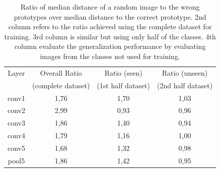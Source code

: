 \begin{table}[htb]
\centering
\begin{tabular}{|c|c||c|c|}
  \hline
  Layer & Overall Ratio & Ratio (seen)  & Ratio (unseen)\\
        & (complete dataset) & (1st half dataset) & (2nd half dataset) \\
  \hline
  conv1 & 1,76 & 1,70 & 1,03 \\ 
  conv2 & 2,99 & 0,93 & 0,96 \\ 
  conv3 & 1,86 & 1,40 & 0,94 \\ 
  conv4 & 1,79 & 1,16 & 1,00 \\ 
  conv5 & 1,68 & 1,32 & 0,98 \\ 
  pool5 & 1,86 & 1,42 & 0,95 \\ 
  \hline
\end{tabular}
\caption{Ratio of median distance of a random image to the wrong prototypes over median distance to the correct prototype. 2nd column refers to the ratio achieved using the complete dataset for training. 3rd column is similar but using only half of the classes. 4th column evaluate the generalization performance by evaluating images from the classes not used for training.}
\label{fulltrainvalues}
\end{table}

